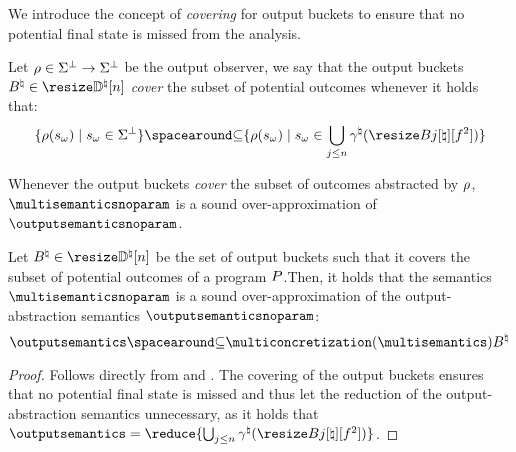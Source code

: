We introduce the concept of \emph{covering} for output buckets to ensure that no potential final state is missed from the analysis.

\begin{definition}[Covering]\label{def:covering}
  Let $\rho\in\Sigma^\bot\to\Sigma^\bot$ be the output observer, we say that the output buckets $\buckets\in\vectorbuckets$ \textit{cover} the subset of potential outcomes whenever it holds that:
  \[
    \setdef{\outputobs(\retrieveoutput\defstate)}{\retrieveoutput{\defstate} \in \stateandbottom} \SubseteQ \setdef{\outputobs(\retrieveoutput\defstate)}{\retrieveoutput\defstate\in\bigsetjoin_{j\le n}\abstractdomainconcretization(\bucket)}
  \]
\end{definition}


Whenever the output buckets \textit{cover} the subset of outcomes abstracted by $\rho$, $\multisemanticsnoparam$ is a sound over-approximation of $\outputsemanticsnoparam$.

\begin{lemma}
  Let $\buckets\in\vectorbuckets$ be the set of output buckets such that it covers the subset of potential outcomes of a program $P$.Then, it holds that the semantics $\multisemanticsnoparam$ is a \textup{sound over-approximation} of the output-abstraction semantics $\outputsemanticsnoparam$:
  \[
    \outputsemantics \SubseteQ \multiconcretization(\multisemantics)\buckets
  \]
\end{lemma}
\begin{proof}
  Follows directly from  and . The covering of the output buckets ensures that no potential final state is missed and thus let the reduction of the output-abstraction semantics unnecessary, as it holds that $\outputsemantics = \reduce{\bigsetjoin_{j\le n}\abstractdomainconcretization(\bucket)}$.
\end{proof}





